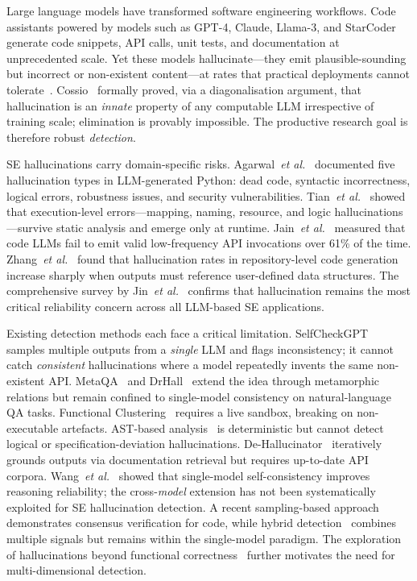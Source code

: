 \documentclass[11pt,a4paper]{article}
\newcommand{\etal}{\textit{et al.}}
\begin{document}
Large language models have transformed software engineering workflows. Code assistants powered by models such as GPT-4, Claude, Llama-3, and StarCoder generate code snippets, API calls, unit tests, and documentation at unprecedented scale. Yet these models hallucinate---they emit plausible-sounding but incorrect or non-existent content---at rates that practical deployments cannot tolerate~\cite{huang2025survey,cossio2025taxonomy}. Cossio~\cite{cossio2025taxonomy} formally proved, via a diagonalisation argument, that hallucination is an \emph{innate} property of any computable LLM irrespective of training scale; elimination is provably impossible. The productive research goal is therefore robust \emph{detection}.

SE hallucinations carry domain-specific risks. Agarwal~\etal~\cite{agarwal2025codemirage} documented five hallucination types in LLM-generated Python: dead code, syntactic incorrectness, logical errors, robustness issues, and security vulnerabilities. Tian~\etal~\cite{tian2025codehalu} showed that execution-level errors---mapping, naming, resource, and logic hallucinations---survive static analysis and emerge only at runtime. Jain~\etal~\cite{jain2025codeapi} measured that code LLMs fail to emit valid low-frequency API invocations over 61\% of the time. Zhang~\etal~\cite{zhang2025llmhallucinations} found that hallucination rates in repository-level code generation increase sharply when outputs must reference user-defined data structures. The comprehensive survey by Jin~\etal~\cite{jin2025llmsurvey} confirms that hallucination remains the most critical reliability concern across all LLM-based SE applications.

Existing detection methods each face a critical limitation. SelfCheckGPT~\cite{manakul2023selfcheckgpt} samples multiple outputs from a \emph{single} LLM and flags inconsistency; it cannot catch \emph{consistent} hallucinations where a model repeatedly invents the same non-existent API. MetaQA~\cite{yang2025metaqa} and DrHall~\cite{wu2025drhall} extend the idea through metamorphic relations but remain confined to single-model consistency on natural-language QA tasks. Functional Clustering~\cite{ravuri2025clustering} requires a live sandbox, breaking on non-executable artefacts. AST-based analysis~\cite{khati2026ast} is deterministic but cannot detect logical or specification-deviation hallucinations. De-Hallucinator~\cite{eghbali2024dehallucinator} iteratively grounds outputs via documentation retrieval but requires up-to-date API corpora. Wang~\etal~\cite{wang2023selfconsistency} showed that single-model self-consistency improves reasoning reliability; the cross-\emph{model} extension has not been systematically exploited for SE hallucination detection. A recent sampling-based approach~\cite{sun2025sampling} demonstrates consensus verification for code, while hybrid detection~\cite{li2025hybrid} combines multiple signals but remains within the single-model paradigm. The exploration of hallucinations beyond functional correctness~\cite{liu2025beyond} further motivates the need for multi-dimensional detection.
\end{document}
